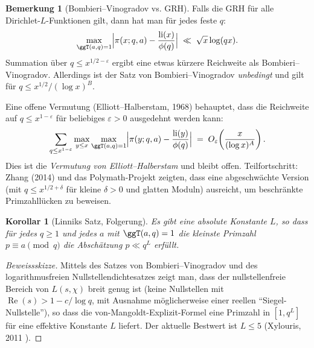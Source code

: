 \documentclass[12pt,a4paper]{amsart}
\newtheorem{korollar}[theorem]{Korollar}
\theoremstyle{definition}
\newtheorem{bemerkung}[theorem]{Bemerkung}
\DeclareMathOperator{\li}{li}
\begin{document}
\begin{bemerkung}[Bombieri--Vinogradov vs. GRH]
  Falls die GRH für alle Dirichlet-$L$-Funktionen gilt, dann hat man
  für jedes feste $q$:
  \[
    \max_{\ggT(a,q)=1}\Bigl|\pi(x;q,a)-\frac{\li(x)}{\phi(q)}\Bigr|
    \;\ll\;
    \sqrt{x}\log(qx).
  \]
  Summation über $q \leq x^{1/2-\varepsilon}$ ergibt eine etwas kürzere
  Reichweite als Bombieri--Vinogradov.  Allerdings ist der Satz von
  Bombieri--Vinogradov \emph{unbedingt} und gilt für $q \leq x^{1/2}/(\log x)^B$.

  Eine offene Vermutung (Elliott--Halberstam, 1968) behauptet, dass die
  Reichweite auf $q \leq x^{1-\varepsilon}$ für beliebiges $\varepsilon > 0$
  ausgedehnt werden kann:
  \[
    \sum_{q \leq x^{1-\varepsilon}}
    \max_{y \leq x}\max_{\ggT(a,q)=1}
    \Bigl|\pi(y;q,a)-\frac{\li(y)}{\phi(q)}\Bigr|
    \;=\; O_\varepsilon\!\left(\frac{x}{(\log x)^A}\right).
  \]
  Dies ist die \emph{Vermutung von Elliott--Halberstam} und bleibt offen.
  Teilfortschritt: Zhang (2014) und das Polymath-Projekt zeigten, dass eine
  abgeschwächte Version (mit $q \leq x^{1/2+\delta}$ für kleine $\delta > 0$
  und glatten Moduln) ausreicht, um beschränkte Primzahllücken zu beweisen.
\end{bemerkung}

\begin{korollar}[Linniks Satz, Folgerung]\label{kor:linnik}
  Es gibt eine absolute Konstante $L$, so dass für jedes $q \geq 1$ und
  jedes $a$ mit $\ggT(a,q)=1$ die kleinste Primzahl $p \equiv a \pmod q$
  die Abschätzung $p \ll q^L$ erfüllt.
\end{korollar}

\begin{proof}[Beweissskizze]
  Mittels des Satzes von Bombieri--Vinogradov und des logarithmusfreien
  Nullstellendichtesatzes zeigt man, dass der nullstellenfreie Bereich von
  $L(s,\chi)$ breit genug ist (keine Nullstellen mit
  $\operatorname{Re}(s) > 1 - c/\log q$, mit Ausnahme möglicherweise einer
  reellen ``Siegel-Nullstelle''), so dass die von-Mangoldt-Explizit-Formel
  eine Primzahl in $[1, q^L]$ für eine effektive Konstante $L$ liefert.
  Der aktuelle Bestwert ist $L \leq 5$ (Xylouris, 2011 \cite{Xylouris2011}).
\end{proof}
\end{document}
